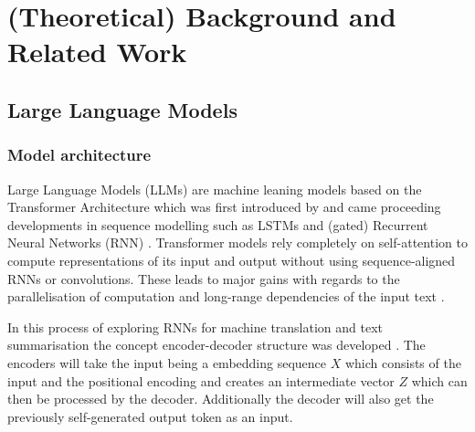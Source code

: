 

\chapter{(Theoretical) Background and Related Work}
\label{chap:background_related-work}


\section{Large Language Models}
\label{sec:llm}
\subsection{Model architecture}
Large Language Models (LLMs) are machine leaning models based on the Transformer Architecture which was first introduced by \citet{vaswani2017attention} and came proceeding developments in sequence modelling such as LSTMs \citep{hochreiter1997long} and (gated) Recurrent Neural Networks (RNN) \citep{cho2014learning}. Transformer models rely completely on self-attention to compute representations of its input and output without using sequence-aligned RNNs or convolutions. These leads to major gains with regards to the parallelisation of computation and long-range dependencies of the input text \citep{kimDHR17}. 

In this process of exploring RNNs for machine translation and text summarisation the concept encoder-decoder structure was developed \citep{sutskever2014sequence}. The encoders will take the input being a embedding sequence $X$ which consists of the input and the positional encoding and creates an intermediate vector $Z$ which can then be processed by the decoder. Additionally the decoder will also get the previously self-generated output token as an input.


